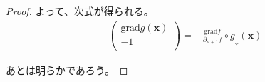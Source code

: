 \documentclass[dvipdfmx]{jsarticle}
\begin{document}
\begin{proof}
\begin{comment}
\partial_{2}f \\
 \vdots \\
\partial_{n}f \\
\end{pmatrix} \right) \circ g_{\downarrow}\left( \mathbf{x} \right)
\end{align*}
\end{comment}
よって、次式が得られる。
\begin{align*}
\begin{pmatrix}
\mathrm{grad}g\left( \mathbf{x} \right) \\
 - 1 \\
\end{pmatrix} = - \frac{\mathrm{grad}f}{\partial_{n + 1}f} \circ g_{\downarrow}\left( \mathbf{x} \right)
\end{align*}
\begin{comment}
\begin{align*}
\begin{pmatrix}
\mathrm{grad}g\left( \mathbf{x} \right) \\
 - 1 \\
\end{pmatrix} &= \begin{pmatrix}
 - \left( \frac{1}{\partial_{n + 1}f}\begin{pmatrix}
\partial_{1}f \\
\partial_{2}f \\
 \vdots \\
\partial_{n}f \\
\end{pmatrix} \right) \circ g_{\downarrow}\left( \mathbf{x} \right) \\
 - \frac{\partial_{n + 1}f}{\partial_{n + 1}f} \circ g_{\downarrow}\left( \mathbf{x} \right) \\
\end{pmatrix}\\
&= - \left( \frac{1}{\partial_{n + 1}f}\begin{pmatrix}
\partial_{1}f \\
\partial_{2}f \\
 \vdots \\
\partial_{n + 1}f \\
\end{pmatrix} \right) \circ g_{\downarrow}\left( \mathbf{x} \right)\\
&= - \frac{\mathrm{grad}f}{\partial_{n + 1}f} \circ g_{\downarrow}\left( \mathbf{x} \right)
\end{align*}
\end{comment}
\par
あとは明らかであろう。
\end{proof}
\end{document}
